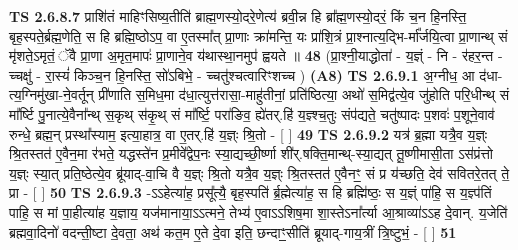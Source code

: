 \documentclass[17pt]{extarticle}
\begin{document}
                  \newline
                                \textbf{ TS 2.6.8.7} \newline
                  प्राशि॑तं माहिꣳसिष्य॒तीति॑ ब्राह्म॒णस्यो॒दरे॒णेत्य॑ ब्रवी॒न्न हि ब्रा᳚ह्म॒णस्यो॒दरं॒ किं च॒न हि॒नस्ति॒ बृह॒स्पते॒र्ब्रह्म॒णेति॒ स हि ब्रह्मि॒ष्ठोऽप॒ वा ए॒तस्मा᳚त् प्रा॒णाः क्रा॑मन्ति॒ यः प्रा॑शि॒त्रं प्रा॒श्नात्य॒द्भि-र्मा᳚र्जयि॒त्वा प्रा॒णान्थ् सं मृ॑शते॒ऽमृतं॒ ॅवै प्रा॒णा अ॒मृत॒मापः॑ प्रा॒णाने॒व य॑थास्था॒नमुप॑ ह्वयते ॥ \textbf{  48} \newline
                  \newline
                      (प्रा॒श्नी॒याद्धोता॑ - य॒ज्ञ्ं - नि - र॑हर॒न्त - च्चक्षु॑ - रा॒स्यं॑ किञ्च॒न हि॒नस्ति॒ सो॑ऽबिभे॒ - च्चतु॑श्चत्वारिꣳशच्च )  \textbf{(A8)} \newline \newline
                                        \textbf{ TS 2.6.9.1} \newline
                  अ॒ग्नीध॒ आ द॑धा-त्य॒ग्निमु॑खा-ने॒वर्तून् प्री॑णाति स॒मिध॒मा द॑धा॒त्युत्त॑रासा॒-माहु॑तीनां॒ प्रति॑ष्ठित्या॒ अथो॑ स॒मिद्व॑त्ये॒व जु॑होति परि॒धीन्थ् सं मा᳚र्ष्टि पु॒नात्ये॒वैना᳚न्थ् स॒कृथ् स॑कृ॒थ् सं मा᳚र्ष्टि॒ परा॑ङिव॒ ह्ये॑तर्.हि॑ य॒ज्ञ्श्च॒तुः संप॑द्यते॒ चतु॑ष्पादः प॒शवः॑ प॒शूने॒वाव॑ रुन्धे॒ ब्रह्म॒न् प्रस्था᳚स्याम॒ इत्या॒हात्र॒ वा ए॒तर्.हि॑ य॒ज्ञ्ः श्रि॒तो - [  ] \textbf{  49} \newline
                  \newline
                                \textbf{ TS 2.6.9.2} \newline
                  यत्र॑ ब्र॒ह्मा यत्रै॒व य॒ज्ञ्ः श्रि॒तस्तत॑ ए॒वैन॒मा र॑भते॒ यद्धस्ते॑न प्र॒मीवे᳚द्वेप॒नः स्या॒द्यच्छी॒र्ष्णा शी॑र्.षक्ति॒मान्थ्-स्या॒द्यत् तू॒ष्णीमासी॒ता ऽस॑प्रंत्तो य॒ज्ञ्ः स्या॒त् प्रति॒ष्ठेत्ये॒व ब्रू॑याद्-वा॒चि वै य॒ज्ञ्ः श्रि॒तो यत्रै॒व य॒ज्ञ्ः श्रि॒तस्तत॑ ए॒वैनꣳ॒॒ सं प्र य॑च्छति॒ देव॑ सवितरे॒तत् ते॒ प्रा - [  ] \textbf{  50} \newline
                  \newline
                                \textbf{ TS 2.6.9.3} \newline
                  -ऽऽहेत्या॑ह॒ प्रसू᳚त्यै॒ बृह॒स्पति॑ र्ब्र॒ह्मेत्या॑ह॒ स हि ब्रह्मि॑ष्ठः॒ स य॒ज्ञ्ं पा॑हि॒ स य॒ज्ञ्प॑तिं पाहि॒ स मां पा॒हीत्या॑ह य॒ज्ञाय॒ यज॑मानाया॒ऽऽत्मने॒ तेभ्य॑ ए॒वाऽऽशिष॒मा शा॒स्तेऽना᳚र्त्या आ॒श्राव्या॑ऽऽह दे॒वान्. य॒जेति॑ ब्रह्मवा॒दिनो॑ वदन्ती॒ष्टा दे॒वता॒ अथ॑ कत॒म ए॒ते दे॒वा इति॒ छन्दाꣳ॒॒सीति॑ ब्रूयाद्-गाय॒त्रीं त्रि॒ष्टुभं॒ - [  ] \textbf{  51} \newline
\end{document}
